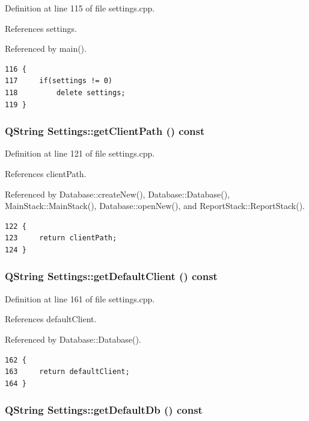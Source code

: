 Definition at line 115 of file settings.cpp.

References settings.

Referenced by main().

\footnotesize\begin{verbatim}116 {
117     if(settings != 0)
118         delete settings;
119 }
\end{verbatim}\normalsize 


\hypertarget{classSettings_a1}{
\subsubsection[getClientPath]{\setlength{\rightskip}{0pt plus 5cm}QString Settings::get\-Client\-Path () const}}
\label{classSettings_a1}


Definition at line 121 of file settings.cpp.

References client\-Path.

Referenced by Database::create\-New(), Database::Database(), Main\-Stack::Main\-Stack(), Database::open\-New(), and Report\-Stack::Report\-Stack().

\footnotesize\begin{verbatim}122 {
123     return clientPath;
124 }
\end{verbatim}\normalsize 


\hypertarget{classSettings_a9}{
\subsubsection[getDefaultClient]{\setlength{\rightskip}{0pt plus 5cm}QString Settings::get\-Default\-Client () const}}
\label{classSettings_a9}


Definition at line 161 of file settings.cpp.

References default\-Client.

Referenced by Database::Database().

\footnotesize\begin{verbatim}162 {
163     return defaultClient;
164 }
\end{verbatim}\normalsize 


\hypertarget{classSettings_a7}{
\subsubsection[getDefaultDb]{\setlength{\rightskip}{0pt plus 5cm}QString Settings::get\-Default\-Db () const}}
\label{classSettings_a7}


